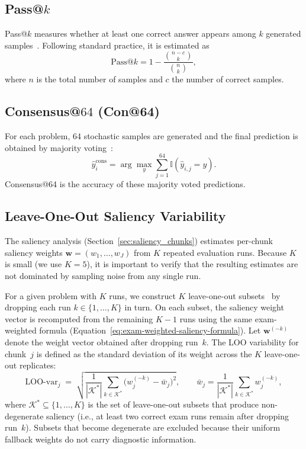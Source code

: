 \documentclass[12pt]{report}
\begin{document}
\subsection{Pass@\texorpdfstring{$k$}{k}}

Pass@$k$ measures whether at least one correct answer appears among $k$ generated samples~\cite{chen2021evaluatinglargelanguagemodels}.
Following standard practice, it is estimated as
\[
\mathrm{Pass@}k
=
1 -
\frac{\binom{n-c}{k}}{\binom{n}{k}},
\]
where $n$ is the total number of samples and $c$ the number of correct samples.

\subsection{Consensus@\texorpdfstring{$64$}{64} (Con@64)}

For each problem, 64 stochastic samples are generated and the final prediction
is obtained by majority voting~\cite{wang2023selfconsistencyimproveschainthought}:
\[
\widehat{y}_i^{\mathrm{cons}}
=
\arg\max_y
\sum_{j=1}^{64}
\mathbb{I}(\widehat{y}_{i,j}=y).
\]
Consensus@64 is the accuracy of these majority voted predictions.

\subsection{Leave-One-Out Saliency Variability}
\label{sec:loo-variability}

The saliency analysis (Section~\ref{sec:saliency_chunks}) estimates
per-chunk saliency weights $\mathbf{w} = (w_1, \dots, w_J)$ from $K$ repeated
evaluation runs.  Because $K$ is small (we use $K = 5$), it is
important to verify that the resulting estimates are not dominated by
sampling noise from any single run. 

For a given problem with $K$ runs, we construct $K$ leave-one-out subsets~\cite{Arlot_2010}
by dropping each run $k \in \{1, \dots, K\}$ in turn.  On each subset, the
saliency weight vector is recomputed from the remaining $K - 1$ runs using
the same exam-weighted formula (Equation~\ref{eq:exam-weighted-saliency-formula}).
Let $\mathbf{w}^{(-k)}$ denote the weight vector obtained after dropping
run~$k$.  The LOO variability for chunk~$j$ is defined as the standard
deviation of its weight across the $K$ leave-one-out replicates:
\begin{equation}
  \mathrm{LOO\text{-}var}_j
  \;=\;
  \sqrt{
    \frac{1}{|\mathcal{K}^*|}
    \sum_{k \in \mathcal{K}^*}
    \bigl(w_j^{(-k)} - \bar{w}_j\bigr)^2
  },
  \qquad
  \bar{w}_j = \frac{1}{|\mathcal{K}^*|}\sum_{k \in \mathcal{K}^*} w_j^{(-k)},
  \label{eq:loo-stability}
\end{equation}
where $\mathcal{K}^* \subseteq \{1, \dots, K\}$ is the set of leave-one-out
subsets that produce non-degenerate saliency (i.e., at least two correct
exam runs remain after dropping run~$k$).  Subsets that become degenerate
are excluded because their uniform fallback weights do not carry diagnostic information.
\end{document}

